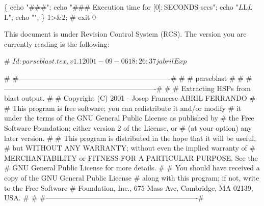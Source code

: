 \documentclass[11pt]{article}
\def\nwendcode{\endtrivlist \endgroup} %
\let\nwdocspar=\par                    %
\begin{document}
\nwenddocs{}\endmoddef
\{ echo "###"; echo "### Execution time for [$0] : $SECONDS secs";
  echo "$L$L$L$L";
  echo ""; \} 1>&2;
#
exit 0
\nwendcode{}\nwdocspar


This document is under Revision Control System (RCS). The version you are currently reading is the following:

\nwenddocs{}\endmoddef
# $Id: parseblast.tex,v 1.1 2001-09-06 18:26:37 jabril Exp $
\nwendcode{}\nwdocspar


\nwenddocs{}\endmoddef
# #----------------------------------------------------------------#
# #                          parseblast                            #
# #----------------------------------------------------------------#
# 
#                Extracting HSPs from blast output.
# 
#     Copyright (C) 2001 - Josep Francesc ABRIL FERRANDO  
#
# This program is free software; you can redistribute it and/or modify
# it under the terms of the GNU General Public License as published by
# the Free Software Foundation; either version 2 of the License, or
# (at your option) any later version.
# 
# This program is distributed in the hope that it will be useful,
# but WITHOUT ANY WARRANTY; without even the implied warranty of
# MERCHANTABILITY or FITNESS FOR A PARTICULAR PURPOSE.  See the
# GNU General Public License for more details.
# 
# You should have received a copy of the GNU General Public License
# along with this program; if not, write to the Free Software
# Foundation, Inc., 675 Mass Ave, Cambridge, MA 02139, USA.
# 
# #----------------------------------------------------------------#
\nwendcode{}\nwdocspar
\end{document}
